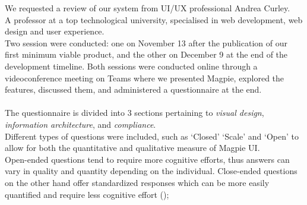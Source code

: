 \noindent We requested a review of our system from UI/UX professional Andrea Curley.\\
A professor at a top technological university, specialised in web development, web design and user experience. \\
\noindent Two session were conducted: one on November 13 after the publication of our first minimum viable product, and the other on December 9 at the end of the development timeline. Both sessions were conducted online through a videoconference meeting on Teams where we presented Magpie, explored the features, discussed them, and administered a questionnaire at the end.\\ \\
The questionnaire is divided into 3 sections pertaining to \emph{visual design}, \emph{information architecture}, and \emph{compliance}.\\
Different types of questions were included, such as `Closed' `Scale' and `Open' to allow for both the quantitative and qualitative measure of Magpie UI.\\
Open-ended questions tend to require more cognitive efforts, thus answers can vary in quality and quantity depending on the individual. Close-ended questions on the other hand offer standardized responses which can be more easily quantified and require less cognitive effort (\cite{mixsurveyquestions2020});
